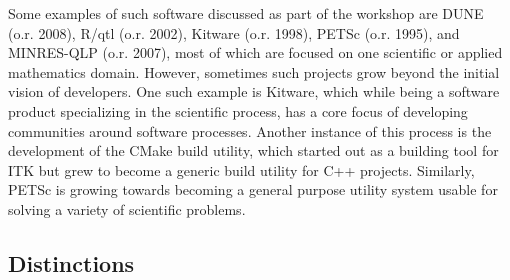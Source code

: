 \documentclass[11pt, oneside]{amsart}
\newcommand{\toolname}[1] {\textsf{#1}}
\begin{document}
Some examples of such software discussed as part of the workshop are
\toolname{DUNE (o.r. 2008)}, \toolname{R/qtl} (o.r. 2002), \toolname{Kitware} (o.r. 1998),
\toolname{PETSc} (o.r. 1995), and \toolname{MINRES-QLP} (o.r. 2007),
most of which are focused on one scientific or applied
mathematics domain. However, sometimes such projects grow beyond the
initial vision of developers. One such example is \toolname{Kitware},
which while being a software product specializing in the scientific
process, has a core focus of developing communities around software
processes. Another instance of this process is the development of the
\toolname{CMake} build utility, which started out as a building tool
for \toolname{ITK} but grew to become a generic build utility for C++
projects. Similarly, \toolname{PETSc} is growing towards becoming a
general purpose utility system usable for solving a variety of
scientific problems.


\subsection{Distinctions}
\end{document}
